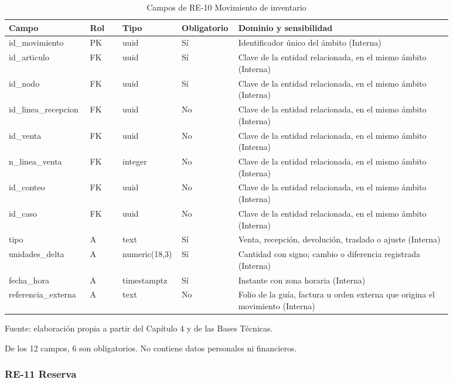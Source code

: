 \documentclass[11pt]{article}
\begin{document}
\begin{table}[htbp]
\caption{Campos de RE-10 Movimiento de inventario}\label{tab:d_re10}
\centering
\begin{tabular}{@{}p{0.167\linewidth}p{0.070\linewidth}p{0.079\linewidth}p{0.097\linewidth}p{0.465\linewidth}@{}}
\toprule Campo & Rol & Tipo & Obligatorio & Dominio y sensibilidad \\
\midrule
id\_movimiento & PK & uuid & Sí & Identificador único del ámbito (Interna) \\
id\_articulo & FK & uuid & Sí & Clave de la entidad relacionada, en el mismo ámbito (Interna) \\
id\_nodo & FK & uuid & Sí & Clave de la entidad relacionada, en el mismo ámbito (Interna) \\
id\_linea\_recepcion & FK & uuid & No & Clave de la entidad relacionada, en el mismo ámbito (Interna) \\
id\_venta & FK & uuid & No & Clave de la entidad relacionada, en el mismo ámbito (Interna) \\
n\_linea\_venta & FK & integer & No & Clave de la entidad relacionada, en el mismo ámbito (Interna) \\
id\_conteo & FK & uuid & No & Clave de la entidad relacionada, en el mismo ámbito (Interna) \\
id\_caso & FK & uuid & No & Clave de la entidad relacionada, en el mismo ámbito (Interna) \\
tipo & A & text & Sí & Venta, recepción, devolución, traslado o ajuste (Interna) \\
unidades\_delta & A & numeric(18,3) & Sí & Cantidad con signo; cambio o diferencia registrada (Interna) \\
fecha\_hora & A & timestamptz & Sí & Instante con zona horaria (Interna) \\
referencia\_externa & A & text & No & Folio de la guía, factura u orden externa que origina el movimiento (Interna) \\
\bottomrule
\end{tabular}
\par\smallskip
{\raggedright Fuente: elaboración propia a partir del Capítulo 4 y de las Bases Técnicas.\par}
\end{table}


De los 12 campos, 6 son obligatorios. No contiene datos personales ni financieros.

\subsubsection{RE-11 Reserva}
\end{document}
